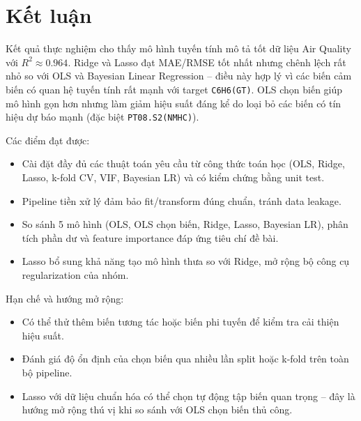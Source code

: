 \documentclass[a4paper]{article}
\begin{document}
\section{Kết luận}

Kết quả thực nghiệm cho thấy mô hình tuyến tính mô tả tốt dữ liệu Air Quality với $R^2 \approx 0.964$. Ridge và Lasso đạt MAE/RMSE tốt nhất nhưng chênh lệch rất nhỏ so với OLS và Bayesian Linear Regression -- điều này hợp lý vì các biến cảm biến có quan hệ tuyến tính rất mạnh với target \texttt{C6H6(GT)}. OLS chọn biến giúp mô hình gọn hơn nhưng làm giảm hiệu suất đáng kể do loại bỏ các biến có tín hiệu dự báo mạnh (đặc biệt \texttt{PT08.S2(NMHC)}).

Các điểm đạt được:
\begin{itemize}
    \item Cài đặt đầy đủ các thuật toán yêu cầu từ công thức toán học (OLS, Ridge, Lasso, k-fold CV, VIF, Bayesian LR) và có kiểm chứng bằng unit test.
    \item Pipeline tiền xử lý đảm bảo fit/transform đúng chuẩn, tránh data leakage.
    \item So sánh 5 mô hình (OLS, OLS chọn biến, Ridge, Lasso, Bayesian LR), phân tích phần dư và feature importance đáp ứng tiêu chí đề bài.
    \item Lasso bổ sung khả năng tạo mô hình thưa so với Ridge, mở rộng bộ công cụ regularization của nhóm.
\end{itemize}

Hạn chế và hướng mở rộng:
\begin{itemize}
    \item Có thể thử thêm biến tương tác hoặc biến phi tuyến để kiểm tra cải thiện hiệu suất.
    \item Đánh giá độ ổn định của chọn biến qua nhiều lần split hoặc k-fold trên toàn bộ pipeline.
    \item Lasso với dữ liệu chuẩn hóa có thể chọn tự động tập biến quan trọng -- đây là hướng mở rộng thú vị khi so sánh với OLS chọn biến thủ công.
\end{itemize}
\end{document}
